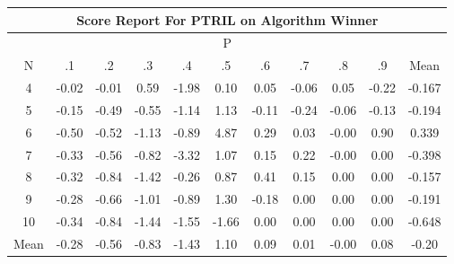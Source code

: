 \documentclass[11pt,a4paper]{report}
\begin{document}
\begin{longtable}{ | c || c | c | c | c | c | c | c | c | c || c |}
\hline
\multicolumn{11}{|c|}{ Score Report For PTRIL on Algorithm Winner} \\
\hline
\multicolumn{11}{|c|}{ P } \\
\hline
N & .1 & .2 & .3 & .4 & .5 & .6 & .7 & .8 & .9 & Mean\\
 \hline
 \hline
 \endhead
  4 &  \cellcolor[HTML]{FFFFFF} -0.02 &  \cellcolor[HTML]{FFFFFF} -0.01 &  \cellcolor[HTML]{EFEFFF} 0.59 &  \cellcolor[HTML]{FFCFCF} -1.98 &  \cellcolor[HTML]{FFFFFF} 0.10 &  \cellcolor[HTML]{FFFFFF} 0.05 &  \cellcolor[HTML]{FFFFFF} -0.06 &  \cellcolor[HTML]{FFFFFF} 0.05 &  \cellcolor[HTML]{FFF7F7} -0.22 & -0.167 \\
  5 &  \cellcolor[HTML]{FFFFFF} -0.15 &  \cellcolor[HTML]{FFEFEF} -0.49 &  \cellcolor[HTML]{FFEFEF} -0.55 &  \cellcolor[HTML]{FFDFDF} -1.14 &  \cellcolor[HTML]{DFDFFF} 1.13 &  \cellcolor[HTML]{FFFFFF} -0.11 &  \cellcolor[HTML]{FFF7F7} -0.24 &  \cellcolor[HTML]{FFFFFF} -0.06 &  \cellcolor[HTML]{FFFFFF} -0.13 & -0.194 \\
  6 &  \cellcolor[HTML]{FFEFEF} -0.50 &  \cellcolor[HTML]{FFEFEF} -0.52 &  \cellcolor[HTML]{FFDFDF} -1.13 &  \cellcolor[HTML]{FFE7E7} -0.89 &  \cellcolor[HTML]{8787FF} 4.87 &  \cellcolor[HTML]{F7F7FF} 0.29 &  \cellcolor[HTML]{FFFFFF} 0.03 &  \cellcolor[HTML]{FFFFFF} -0.00 &  \cellcolor[HTML]{E7E7FF} 0.90 & 0.339 \\
  7 &  \cellcolor[HTML]{FFF7F7} -0.33 &  \cellcolor[HTML]{FFEFEF} -0.56 &  \cellcolor[HTML]{FFE7E7} -0.82 &  \cellcolor[HTML]{FFAFAF} -3.32 &  \cellcolor[HTML]{E7E7FF} 1.07 &  \cellcolor[HTML]{FFFFFF} 0.15 &  \cellcolor[HTML]{F7F7FF} 0.22 &  \cellcolor[HTML]{FFFFFF} -0.00 &  \cellcolor[HTML]{FFFFFF} 0.00 & -0.398 \\
  8 &  \cellcolor[HTML]{FFF7F7} -0.32 &  \cellcolor[HTML]{FFE7E7} -0.84 &  \cellcolor[HTML]{FFDFDF} -1.42 &  \cellcolor[HTML]{FFF7F7} -0.26 &  \cellcolor[HTML]{E7E7FF} 0.87 &  \cellcolor[HTML]{F7F7FF} 0.41 &  \cellcolor[HTML]{FFFFFF} 0.15 &  \cellcolor[HTML]{FFFFFF} 0.00 &  \cellcolor[HTML]{FFFFFF} 0.00 & -0.157 \\
  9 &  \cellcolor[HTML]{FFF7F7} -0.28 &  \cellcolor[HTML]{FFEFEF} -0.66 &  \cellcolor[HTML]{FFE7E7} -1.01 &  \cellcolor[HTML]{FFE7E7} -0.89 &  \cellcolor[HTML]{DFDFFF} 1.30 &  \cellcolor[HTML]{FFF7F7} -0.18 &  \cellcolor[HTML]{FFFFFF} 0.00 &  \cellcolor[HTML]{FFFFFF} 0.00 &  \cellcolor[HTML]{FFFFFF} 0.00 & -0.191 \\
  10 &  \cellcolor[HTML]{FFF7F7} -0.34 &  \cellcolor[HTML]{FFE7E7} -0.84 &  \cellcolor[HTML]{FFD7D7} -1.44 &  \cellcolor[HTML]{FFD7D7} -1.55 &  \cellcolor[HTML]{FFD7D7} -1.66 &  \cellcolor[HTML]{FFFFFF} 0.00 &  \cellcolor[HTML]{FFFFFF} 0.00 &  \cellcolor[HTML]{FFFFFF} 0.00 &  \cellcolor[HTML]{FFFFFF} 0.00 & -0.648 \\
 \hline
 \hline
Mean &  \cellcolor[HTML]{FFF7F7} -0.28 &  \cellcolor[HTML]{FFEFEF} -0.56 &  \cellcolor[HTML]{FFE7E7} -0.83 &  \cellcolor[HTML]{FFD7D7} -1.43 &  \cellcolor[HTML]{E7E7FF} 1.10 &  \cellcolor[HTML]{FFFFFF} 0.09 &  \cellcolor[HTML]{FFFFFF} 0.01 &  \cellcolor[HTML]{FFFFFF} -0.00 &  \cellcolor[HTML]{FFFFFF} 0.08 &  \cellcolor[HTML]{FFF7F7} -0.20
\end{longtable}
\end{document}
